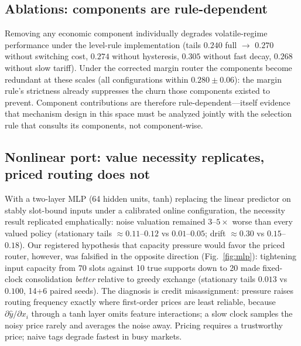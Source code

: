 \documentclass[10pt,twocolumn]{article}
\theoremstyle{definition}
\begin{document}
\subsection{Ablations: components are rule-dependent}
Removing any economic component individually degrades volatile-regime performance under the level-rule
implementation (tails $0.240$ full $\to$ $0.270$ without switching cost, $0.274$ without hysteresis,
$0.305$ without fast decay, $0.268$ without slow tariff). Under the corrected margin router the components
become redundant at these scales (all configurations within $0.280\pm0.06$): the margin rule's strictness
already suppresses the churn those components existed to prevent. Component contributions are therefore
rule-dependent---itself evidence that mechanism design in this space must be analyzed jointly with the
selection rule that consults its components, not component-wise.

\subsection{Nonlinear port: value necessity replicates, priced routing does not}\label{sec:nnport}

With a two-layer {MLP} (64 hidden units, tanh) replacing the linear predictor on stably slot-bound inputs
under a calibrated online configuration, the necessity result replicated emphatically: noise valuation
remained $3$--$5\times$ worse than every valued policy (stationary tails ${\approx}0.11$--$0.12$ vs
$0.01$--$0.05$; drift ${\approx}0.30$ vs $0.15$--$0.18$). Our registered hypothesis that capacity pressure
would favor the priced router, however, was falsified in the opposite direction (Fig.~\ref{fig:mlp}):
tightening input capacity from 70 slots against 10 true supports down to 20 made fixed-clock consolidation
\emph{better} relative to greedy exchange (stationary tails $0.013$ vs $0.100$, 14+6 paired seeds). The
diagnosis is credit misassignment: pressure raises routing frequency exactly where first-order prices are
least reliable, because $\partial\hat y/\partial x_i$ through a tanh layer omits feature interactions; a
slow clock samples the noisy price rarely and averages the noise away. Pricing requires a trustworthy price;
naive tags degrade fastest in busy markets.
\end{document}
